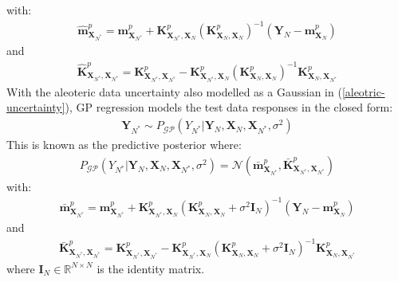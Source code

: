 \documentclass{article}
\newcommand{\GP}{\operatorname{\mathcal{GP}}}
\numberwithin{equation}{section}
\begin{document}
with:
\begin{align}
    \label{gp-epistemic-posterior-mean}
    \hat{\mathbf{m}}^p_{\mathbf{X}_{N^*}} = \mathbf{m}^p_{\mathbf{X}_{N^*}} + \mathbf{K}^p_{\mathbf{X}_{N^*}, \mathbf{X}_N} \left(\mathbf{K}^p_{\mathbf{X}_N, \mathbf{X}_N}\right)^{-1} \left( \mathbf{Y}_N - \mathbf{m}^p_{\mathbf{X}_N}\right)
\end{align}
and
\begin{align}
    \label{gp-epistemic-posterior-covariance}
    \hat{\mathbf{K}}^p_{\mathbf{X}_{N^*}, \mathbf{X}_{N^*}} = \mathbf{K}^p_{\mathbf{X}_{N^*}, \mathbf{X}_{N^*}} - \mathbf{K}^p_{\mathbf{X}_{N^*}, \mathbf{X}_N}\left(\mathbf{K}^p_{\mathbf{X}_N, \mathbf{X}_N}\right)^{-1}\mathbf{K}^p_{\mathbf{X}_N, \mathbf{X}_{N^*}}
\end{align}
With the aleoteric data uncertainty also modelled as a Gaussian in (\ref{aleotric-uncertainty}), GP regression models the test data responses in the closed form:
\begin{align}
    \mathbf{Y}_{N^*} \sim P_{\GP}\left(Y_{N^*} \vert \mathbf{Y}_N, \mathbf{X}_N, \mathbf{X}_{N^*}, \sigma^2\right)
    \label{gp-posterior}
\end{align}
This is known as the predictive posterior where:
\begin{align}
    P_{\GP}\left(Y_{N^*} \vert \mathbf{Y}_N, \mathbf{X}_N, \mathbf{X}_{N^*}, \sigma^2\right) = \mathcal{N}\left(\bar{\mathbf{m}}^p_{\mathbf{X}_{N^*}}, \bar{\mathbf{K}}^p_{\mathbf{X}_{N^*}, \mathbf{X}_{N^*}}\right)
    \label{gp-posterior-normal}
\end{align}
with:
\begin{align}
    \label{gp-posterior-mean}
    \bar{\mathbf{m}}^p_{\mathbf{X}_{N^*}} = \mathbf{m}^p_{\mathbf{X}_{N^*}} + \mathbf{K}^p_{\mathbf{X}_{N^*}, \mathbf{X}_N} \left( \mathbf{K}^p_{\mathbf{X}_N, \mathbf{X}_N} + \sigma^2 \mathbf{I}_N\right)^{-1} \left( \mathbf{Y}_N - \mathbf{m}^p_{\mathbf{X}_N}\right)
\end{align}
and
\begin{align}
    \label{gp-posterior-covariance}
    \bar{\mathbf{K}}^p_{\mathbf{X}_{N^*}, \mathbf{X}_{N^*}} = \mathbf{K}^p_{\mathbf{X}_{N^*}, \mathbf{X}_{N^*}} - \mathbf{K}^p_{\mathbf{X}_{N^*}, \mathbf{X}_N}\left( \mathbf{K}^p_{\mathbf{X}_N, \mathbf{X}_N} + \sigma^2 \mathbf{I}_N\right)^{-1}\mathbf{K}^p_{\mathbf{X}_N, \mathbf{X}_{N^*}}
\end{align}
where $\mathbf{I}_N \in \mathbb{R}^{N \times N}$ is the identity matrix.
\end{document}
